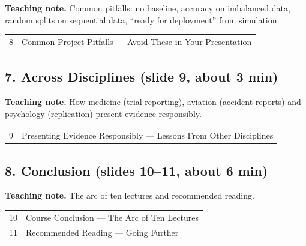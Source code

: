 \documentclass[11pt]{article}
\begin{document}
\textbf{Teaching note.} Common pitfalls: no baseline, accuracy on imbalanced data, random splits on sequential data, ``ready for deployment'' from simulation.

\begin{center}\small\renewcommand{\arraystretch}{1.1}\begin{tabularx}{\textwidth}{@{}r X@{}}8 & Common Project Pitfalls --- Avoid These in Your Presentation\\\end{tabularx}\end{center}

\subsection{7. Across Disciplines \normalfont\small\color{GreyN}(slide 9, about 3 min)}

\textbf{Teaching note.} How medicine (trial reporting), aviation (accident reports) and psychology (replication) present evidence responsibly.

\begin{center}\small\renewcommand{\arraystretch}{1.1}\begin{tabularx}{\textwidth}{@{}r X@{}}9 & Presenting Evidence Responsibly --- Lessons From Other Disciplines\\\end{tabularx}\end{center}

\subsection{8. Conclusion \normalfont\small\color{GreyN}(slides 10--11, about 6 min)}

\textbf{Teaching note.} The arc of ten lectures and recommended reading.

\begin{center}\small\renewcommand{\arraystretch}{1.1}\begin{tabularx}{\textwidth}{@{}r X@{}}10 & Course Conclusion --- The Arc of Ten Lectures\\
11 & Recommended Reading --- Going Further\\\end{tabularx}\end{center}
\end{document}
